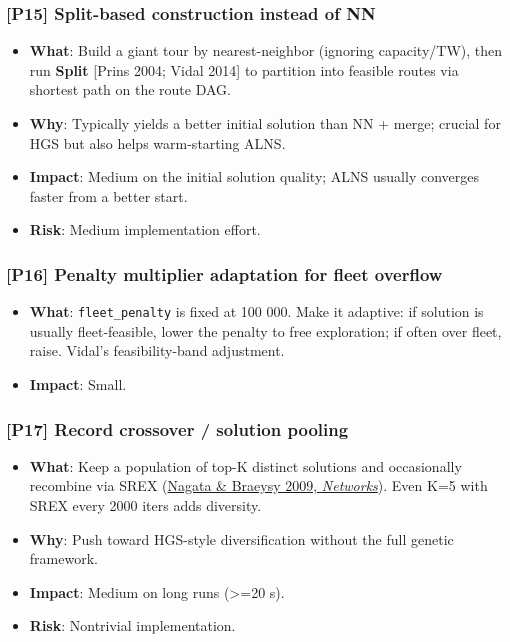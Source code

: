 \documentclass[twocolumn,10pt,letterpaper]{article}
\begin{document}
\subsubsection{[P15] Split-based construction instead of NN}
\begin{itemize}
\setlength{\itemsep}{0pt}
\setlength{\parskip}{0pt}
  \item \textbf{What}: Build a giant tour by nearest-neighbor (ignoring capacity/TW), then run \textbf{Split} [Prins 2004; Vidal 2014] to partition into feasible routes via shortest path on the route DAG.
  \item \textbf{Why}: Typically yields a better initial solution than NN + merge; crucial for HGS but also helps warm-starting ALNS.
  \item \textbf{Impact}: Medium on the initial solution quality; ALNS usually converges faster from a better start.
  \item \textbf{Risk}: Medium implementation effort.
\end{itemize}

\subsubsection{[P16] Penalty multiplier adaptation for fleet overflow}
\begin{itemize}
\setlength{\itemsep}{0pt}
\setlength{\parskip}{0pt}
  \item \textbf{What}: \texttt{fleet\_penalty} is fixed at 100 000. Make it adaptive: if solution is usually fleet-feasible, lower the penalty to free exploration; if often over fleet, raise. Vidal's feasibility-band adjustment.
  \item \textbf{Impact}: Small.
\end{itemize}

\subsubsection{[P17] Record crossover / solution pooling}
\begin{itemize}
\setlength{\itemsep}{0pt}
\setlength{\parskip}{0pt}
  \item \textbf{What}: Keep a population of top-K distinct solutions and occasionally recombine via SREX (\href{https://doi.org/10.1002/net.20338}{Nagata \& Braeysy 2009, \textit{Networks}}). Even K=5 with SREX every 2000 iters adds diversity.
  \item \textbf{Why}: Push toward HGS-style diversification without the full genetic framework.
  \item \textbf{Impact}: Medium on long runs (>=20 s).
  \item \textbf{Risk}: Nontrivial implementation.
\end{itemize}
\end{document}
